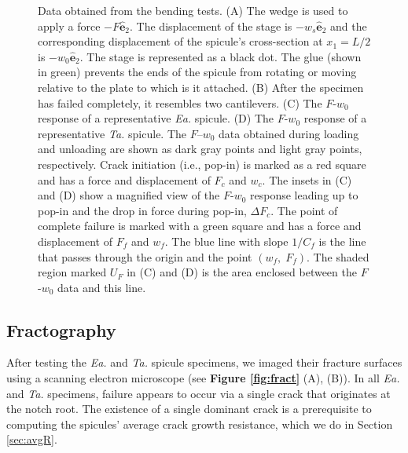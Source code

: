 \documentclass[12pt,onecolumn]{article}
\makeatletter
\newcommand{\ey}{{\bm{\hat{e}}}_2}
\newcommand{\TA}{\textit{Ta.\@}\xspace}
\newcommand{\EA}{\textit{Ea.\@}\xspace}
\makeatother
\begin{document}
\begin{bibunit}
\begin{figure}[ht!]
			\caption{Data obtained from the bending tests. (A) The wedge is used to apply a force $-F\ey$. The displacement of the stage is $-w_s\ey$ and the corresponding displacement of the spicule's cross-section at $x_1=L/2$ is $-w_0\ey$. The stage is represented as a black dot. The glue (shown in green) prevents the ends of the spicule from rotating or moving relative to the plate to which is it attached. (B) After the specimen has failed completely, it resembles two cantilevers. (C) The $F$-$w_0$ response of a representative \EA spicule. (D) The $F$-$w_0$ response of a representative \TA spicule. The $F$--$w_0$ data obtained during loading and unloading are shown as dark gray points and light gray points, respectively. Crack initiation (i.e., pop-in) is marked as a red square and has a force and displacement of $F_c$ and $w_c$. The insets in (C) and (D) show a magnified view of the $F$-$w_0$ response leading up to pop-in and the drop in force during pop-in, $\Delta F_c$. The point of complete failure is marked with a green square and has a force and displacement of $F_f$ and $w_f$. The blue line with slope $1/C_f$ is the line that passes through the origin and the point $(w_f,\; F_f)$. The shaded region marked $U_F$ in (C) and (D) is the area enclosed between the $F$-$w_0$ data and this line.
			}
			\label{fig:test}
			\end{figure}
 			
			
\subsection{Fractography}
\label{sec:fracto}
 After testing the \EA and \TA spicule specimens, we imaged their fracture surfaces using a scanning electron microscope (see {\bf Figure \ref{fig:fract}} (A), (B)). In all \EA and \TA specimens, failure appears to occur via a single crack that originates at the notch root. The existence of a single dominant crack is a prerequisite to computing the spicules' average crack growth resistance, which we do in Section \ref{sec:avgR}. 
 

\end{bibunit}
\end{document}
